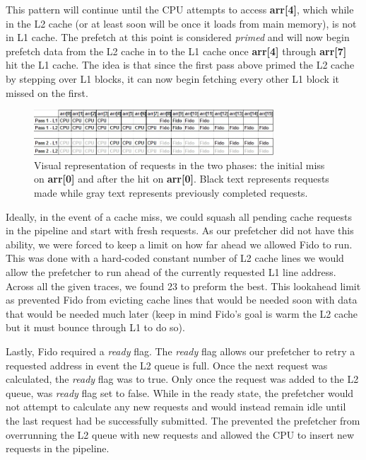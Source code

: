 \documentclass[11pt]{article}
\begin{document}
This pattern will continue until the CPU attempts to access \textbf{arr[4]}, which while in the L2 cache (or at least soon will be once it loads from main memory), is not in L1 cache. The prefetch at this point is considered \textit{primed} and will now begin prefetch data from the L2 cache in to the L1 cache once \textbf{arr[4]} through \textbf{arr[7]} hit the L1 cache. The idea is that since the first pass above primed the L2 cache by stepping over L1 blocks, it can now begin fetching every other L1 block it missed on the first.   
  
\begin{figure}[H]
\centering
\includegraphics[width=0.8\textwidth]{FidoExample.jpg}
\caption{Visual representation of requests in the two phases: the initial miss on \textbf{arr[0]} and after the hit on \textbf{arr[0]}. Black text represents requests made while gray text represents previously completed requests. }
\end{figure}

Ideally, in the event of a cache miss, we could squash all pending cache requests in the pipeline and start with fresh requests. As our prefetcher did not have this ability, we were forced to keep a limit on how far ahead we allowed Fido to run. This was done with a hard-coded constant number of L2 cache lines we would allow the prefetcher to run ahead of the currently requested L1 line address. Across all the given traces, we found 23 to preform the best. This lookahead limit as prevented Fido from evicting cache lines that would be needed soon with data that would be needed much later (keep in mind Fido's goal is warm the L2 cache but it must bounce through L1 to do so).

Lastly, Fido required a \textit{ready} flag. The \textit{ready} flag allows our prefetcher to retry a requested address in event the L2 queue is full. Once the next request was calculated, the \textit{ready} flag was to true. Only once the request was added to the L2 queue, was \textit{ready} flag set to false. While in the ready state, the prefetcher would not attempt to calculate any new requests and would instead remain idle until the last request had be successfully submitted. The prevented the prefetcher from overrunning the L2 queue with new requests and allowed the CPU to insert new requests in the pipeline.
\end{document}
